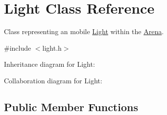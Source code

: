 \hypertarget{classLight}{}\section{Light Class Reference}
\label{classLight}


Class representing an mobile \hyperlink{classLight}{Light} within the \hyperlink{classArena}{Arena}.  




{\ttfamily \#include $<$light.\+h$>$}



Inheritance diagram for Light\+:


Collaboration diagram for Light\+:
\subsection*{Public Member Functions}
